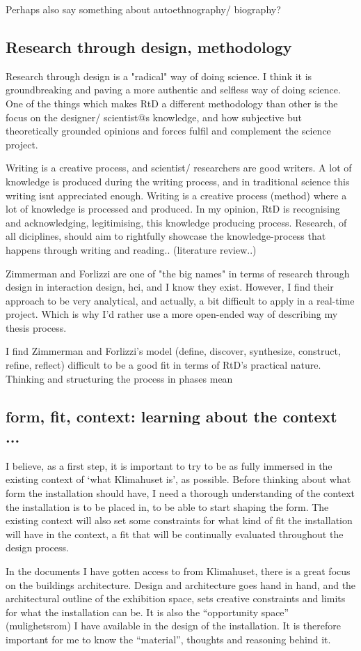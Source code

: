 Perhaps also say something about autoethnography/ biography?


\subsection{Research through design, methodology}

Research through design is a "radical" way of doing science. I think it is groundbreaking and paving a more authentic and selfless way of doing science. One of the things which makes RtD a different methodology than other is the focus on the designer/ scientist@s knowledge, and how subjective but theoretically grounded opinions and forces fulfil and complement the science project. 

Writing is a creative process, and scientist/ researchers are good writers. A lot of knowledge is produced during the writing process, and in traditional science this writing isnt appreciated enough. Writing is a creative process (method) where a lot of knowledge is processed and produced. In my opinion, RtD is recognising and acknowledging, legitimising, this knowledge producing process. Research, of all diciplines, should aim to rightfully showcase the knowledge-process that happens through writing and reading..  (literature review..)

Zimmerman and Forlizzi are one of "the big names" in terms of research through design in interaction design, hci, and I know they exist. However, I find their approach to be very analytical, and actually, a bit difficult to apply in a real-time project. Which is why I'd rather use a more open-ended way of describing my thesis process. 

I find Zimmerman and Forlizzi's model (define, discover, synthesize, construct, refine, reflect) difficult to be a good fit in terms of RtD's practical nature. Thinking and structuring the process in phases mean 


\subsection{form, fit, context: learning about the context ...}

I believe, as a first step, it is important to try to be as fully immersed in the existing context of ‘what Klimahuset is’, as possible. Before thinking about what form the installation should have, I need a thorough understanding of the context the installation is to be placed in, to be able to start shaping the form. The existing context will also set some constraints for what kind of fit the installation will have in the context, a fit that will be continually evaluated throughout the design process. 


In the documents I have gotten access to from Klimahuset, there is a great focus on the buildings architecture. Design and architecture goes hand in hand, and the architectural outline of the exhibition space, sets creative constraints and limits for what the installation can be. It is also the “opportunity space” (mulighetsrom) I have available in the design of the installation. It is therefore important for me to know the “material”, thoughts and reasoning behind it.